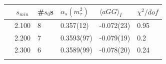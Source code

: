 \documentclass[../../index.tex]{subfiles}
\begin{document}
\begin{table}
  \centering
  \begin{tabularx}{\textwidth}{ccYYYY}
    \toprule
    & \(s_{min}\) & \#\(s_0\)s & \(\alpha_s(m_\tau^2)\) & \(\langle aGG \rangle_I\) & \(\chi^2/dof\)  \\
    \midrule
    \parbox[t]{2mm}{}
    & 2.100 & 8  & 0.357(12) & -0.072(23) & 0.95 \\
    & 2.200 &  7  & 
    0.3593(97) &  -0.079(19) &  0.2 \\
    &  2.300 &  6  & 
    0.3589(99) &  -0.078(20) &  0.24 \\
    \midrule     
    \parbox[t]{2mm}{}

\end{tabularx}
\end{table}
\end{document}
